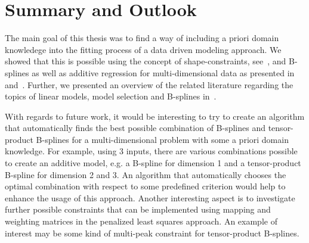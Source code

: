\chapter{Summary and Outlook} \label{cha:summary}

The main goal of this thesis was to find a way of including a priori domain knowledege into the fitting process of a data driven modeling approach. We showed that this is possible using the concept of shape-constraints, see~, and B-splines as well as additive regression for multi-dimensional data as presented in~ and~. Further, we presented an overview of the related literature regarding the topics of linear models, model selection and B-splines in~. 

With regards to future work, it would be interesting to try to create an algorithm that automatically finds the best possible combination of B-splines and tensor-product B-splines for a multi-dimensional problem with some a priori domain knowledge. For example, using 3 inputs, there are various combinations possible to create an additive model, e.g. a B-spline for dimension 1 and a tensor-product B-spline for dimension 2 and 3. An algorithm that automatically chooses the optimal combination with respect to some predefined criterion would help to enhance the usage of this approach. Another interesting aspect is to investigate further possible constraints that can be implemented using mapping and weighting matrices in the penalized least squares approach. An example of interest may be some kind of multi-peak constraint for tensor-product B-splines. 